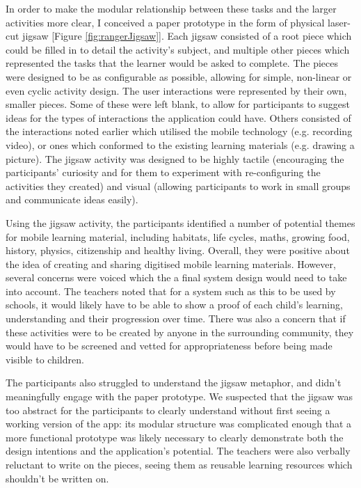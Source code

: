 In order to make the modular relationship between these tasks and the larger activities more clear, I conceived a paper prototype in the form of physical laser-cut jigsaw [Figure \ref{fig:rangerJigsaw}]. Each jigsaw consisted of a root piece which could be filled in to detail the activity’s subject, and multiple other pieces which represented the tasks that the learner would be asked to complete. The pieces were designed to be as configurable as possible, allowing for simple, non-linear or even cyclic activity design. The user interactions were represented by their own, smaller pieces. Some of these were left blank, to allow for participants to suggest ideas for the types of interactions the application could have. Others consisted of the interactions noted earlier which utilised the mobile technology (e.g. recording video), or ones which conformed to the existing learning materials (e.g. drawing a picture). The jigsaw activity was designed to be highly tactile (encouraging the participants’ curiosity and for them to experiment with re-configuring the activities they created) and visual (allowing participants to work in small groups and communicate ideas easily).

Using the jigsaw activity, the participants identified a number of potential themes for mobile learning material, including habitats, life cycles, maths, growing food, history, physics, citizenship and healthy living. Overall, they were positive about the idea of creating and sharing digitised mobile learning materials. However, several concerns were voiced which the a final system design would need to take into account. The teachers noted that for a system such as this to be used by schools, it would likely have to be able to show a proof of each child’s learning, understanding and their progression over time. There was also a concern that if these activities were to be created by anyone in the surrounding community, they would have to be screened and vetted for appropriateness before being made visible to children.

The participants also struggled to understand the jigsaw metaphor, and didn't meaningfully engage with the paper prototype. We suspected that the jigsaw was too abstract for the participants to clearly understand without first seeing a working version of the app: its modular structure was complicated enough that a more functional prototype was likely necessary to clearly demonstrate both the design intentions and the application’s potential. The teachers were also verbally reluctant to write on the pieces, seeing them as reusable learning resources which shouldn't be written on.

